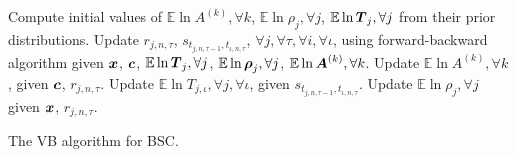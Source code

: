 \begin{algorithm}
\DontPrintSemicolon
 \nl Compute initial values of $\mathbb{E}\ln A^{(k)},\forall k$,
 $\mathbb{E}\ln \rho_j,\forall j$, 
 $\mathbb{E}\ln \boldsymbol T_j,\forall j$ 
 from their prior distributions.\;
 {
 \nl Update $r_{j,n,\tau}$, $s_{t_{j,n,\tau\!-\!1}, t_{\iota,n,\tau}}$, $\forall j,\forall \tau,\forall i,\forall \iota$,
 using forward-backward algorithm
 given $\boldsymbol x$, $\boldsymbol c$, $\mathbb{E}\ln \boldsymbol T_j,\forall j$,
 $\mathbb{E}\ln\boldsymbol\rho_j,\forall j$, 
  $\mathbb{E}\ln\boldsymbol A^{(k)},\forall k$.\;%
 \nl Update $\mathbb{E}\ln A^{(k)},\forall k$, 
 given $\boldsymbol c$, $r_{j,n,\tau}$.\;
 \nl Update $\mathbb{E}\ln T_{j,\iota},\forall j,\forall \iota$, 
 given $s_{t_{j,n,\tau\!-\!1}, t_{\iota,n,\tau}}$.\;
 \nl Update $\mathbb{E}\ln \rho_j,\forall j$ given $\boldsymbol x$, $r_{j,n,\tau}$.
 }
\;
\caption{The VB algorithm for BSC.}
\label{al:vb_bac}
\end{algorithm}

